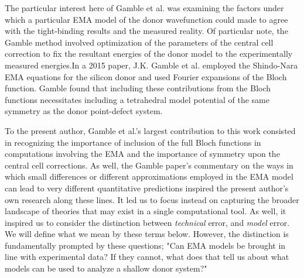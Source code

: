 The particular interest here of Gamble et al. was examining the factors under
which a particular EMA model of the donor wavefunction could made to agree with
the tight-binding results and the measured reality. Of particular note, the
Gamble method involved optimization of the parameters of the central cell
correction to fix the resultant energies of the donor model to the
experimentally measured energies.In a 2015 paper\cite{Gamble}, J.K. Gamble et
al. employed the Shindo-Nara EMA equations for the silicon donor and used
Fourier expansions of the Bloch function. Gamble found that including these
contributions from the Bloch functions necessitates including a tetrahedral
model potential of the same symmetry as the donor point-defect system.

To the present author, Gamble et al.'s largest contribution to this work
consisted in recognizing the importance of inclusion of the full Bloch functions
in computations involving the EMA and the importance of symmetry upon the
central cell corrections. As well, the Gamble paper's commentary on the ways in
which small differences or different approximations employed in the EMA model
can lead to very different quantitative predictions inspired the present
author's own research along these lines. It led us to focus instead on capturing
the broader landscape of theories that may exist in a single computational tool.
As well, it inspired us to consider the distinction between \emph{technical}
error, and \emph{model} error. We will define what we mean by these terms below.
However, the distinction is fundamentally prompted by these questions; "Can EMA
models be brought in line with experimental data? If they cannot, what does that
tell us about what models can be used to analyze a shallow donor system?"